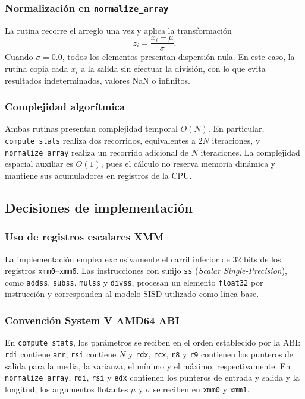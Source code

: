 \documentclass[journal]{IEEEtran}
\begin{document}
\subsubsection{Normalización en \texttt{normalize\_array}}

La rutina recorre el arreglo una vez y aplica la transformación
\begin{equation}
  z_i=\frac{x_i-\mu}{\sigma}.
  \label{eq:scalar-normalization}
\end{equation}
Cuando $\sigma=0.0$, todos los elementos presentan dispersión nula. En este
caso, la rutina copia cada $x_i$ a la salida sin efectuar la división, con lo
que evita resultados indeterminados, valores NaN o infinitos.

\subsubsection{Complejidad algorítmica}

Ambas rutinas presentan complejidad temporal $O(N)$. En particular,
\texttt{compute\_stats} realiza dos recorridos, equivalentes a $2N$ iteraciones,
y \texttt{normalize\_array} realiza un recorrido adicional de $N$ iteraciones.
La complejidad espacial auxiliar es $O(1)$, pues el cálculo no reserva memoria
dinámica y mantiene sus acumuladores en registros de la CPU.

\subsection{Decisiones de implementación}

\subsubsection{Uso de registros escalares XMM}

La implementación emplea exclusivamente el carril inferior de 32 bits de los
registros \texttt{xmm0}--\texttt{xmm6}. Las instrucciones con sufijo
\texttt{ss} (\textit{Scalar Single-Precision}), como \texttt{addss},
\texttt{subss}, \texttt{mulss} y \texttt{divss}, procesan un elemento
\texttt{float32} por instrucción y corresponden al modelo SISD utilizado como
línea base.

\subsubsection{Convención System V AMD64 ABI}

En \texttt{compute\_stats}, los parámetros se reciben en el orden establecido
por la ABI: \texttt{rdi} contiene \texttt{arr}, \texttt{rsi} contiene $N$ y
\texttt{rdx}, \texttt{rcx}, \texttt{r8} y \texttt{r9} contienen los punteros
de salida para la media, la varianza, el mínimo y el máximo, respectivamente.
En \texttt{normalize\_array}, \texttt{rdi}, \texttt{rsi} y \texttt{edx}
contienen los punteros de entrada y salida y la longitud; los argumentos
flotantes $\mu$ y $\sigma$ se reciben en \texttt{xmm0} y \texttt{xmm1}.
\end{document}
